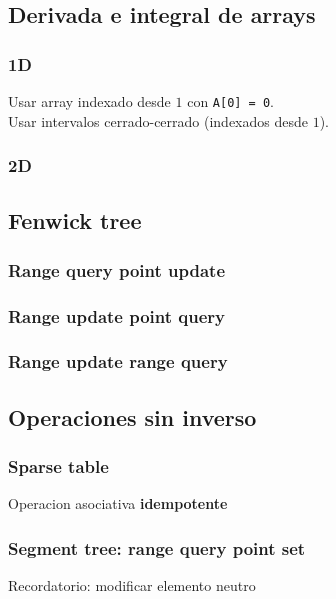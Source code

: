 \subsection{Derivada e integral de arrays}
    \subsubsection{1D}
        Usar array indexado desde $1$ con \texttt{A[0] = 0}. \\
        Usar intervalos cerrado-cerrado (indexados desde $1$).
    \subsubsection{2D}
\subsection{Fenwick tree}
    \subsubsection{Range query point update}
    \subsubsection{Range update point query}
    \subsubsection{Range update range query}
\subsection{Operaciones sin inverso}
    \subsubsection{Sparse table}
        Operacion asociativa \textbf{idempotente}
    \subsubsection{Segment tree: range query point set}
        Recordatorio: modificar elemento neutro
       
